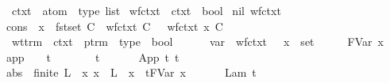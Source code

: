 \begin{isabellebody}
%
\isamarkuptrue%
\isamarkupfalse%
\ ctxt\ {\isacharequal}\ {\isachardoublequoteopen}{\isacharparenleft}atom\ {\isasymtimes}\ type{\isacharparenright}\ list{\isachardoublequoteclose}\isanewline
\isanewline
{}\isamarkupfalse%
\ wf{\isacharunderscore}ctxt\ {\isacharcolon}{\isacharcolon}\ {\isachardoublequoteopen}ctxt\ {\isasymRightarrow}\ bool{\isachardoublequoteclose}\ \isanewline
nil{\isacharcolon}\ {\isachardoublequoteopen}wf{\isacharunderscore}ctxt\ {\isacharbrackleft}{\isacharbrackright}{\isachardoublequoteclose}\ {\isacharbar}\isanewline
cons{\isacharcolon}\ {\isachardoublequoteopen}{\isasymlbrakk}\ x\ {\isasymnotin}\ fst{\isacharbackquote}set\ C\ {\isacharsemicolon}\ wf{\isacharunderscore}ctxt\ C\ {\isasymrbrakk}\ {\isasymLongrightarrow}\ wf{\isacharunderscore}ctxt\ {\isacharparenleft}{\isacharparenleft}x{\isacharcomma}\ {\isasymsigma}{\isacharparenright}{\isacharhash}C{\isacharparenright}{\isachardoublequoteclose}\isanewline
\isanewline
{}\isamarkupfalse%
\ wt{\isacharunderscore}trm\ {\isacharcolon}{\isacharcolon}\ {\isachardoublequoteopen}ctxt\ {\isasymRightarrow}\ ptrm\ {\isasymRightarrow}\ type\ {\isasymRightarrow}\ bool{\isachardoublequoteclose}\ {\isacharparenleft}{\isachardoublequoteopen}{\isacharunderscore}\ {\isasymturnstile}\ {\isacharunderscore}\ {\isacharcolon}\ {\isacharunderscore}{\isachardoublequoteclose}{\isacharparenright}\ \isanewline
var{\isacharcolon}\ {\isachardoublequoteopen}{\isasymlbrakk}\ wf{\isacharunderscore}ctxt\ {\isasymGamma}\ {\isacharsemicolon}\ {\isacharparenleft}x{\isacharcomma}{\isasymsigma}{\isacharparenright}\ {\isasymin}\ set\ {\isasymGamma}\ {\isasymrbrakk}\ {\isasymLongrightarrow}\ {\isasymGamma}\ {\isasymturnstile}\ FVar\ x\ {\isacharcolon}\ {\isasymsigma}{\isachardoublequoteclose}\ {\isacharbar}\isanewline
app{\isacharcolon}\ {\isachardoublequoteopen}{\isasymlbrakk}\ {\isasymGamma}\ {\isasymturnstile}\ t{}\ {\isacharcolon}\ {\isasymtau}\ {\isasymrightarrow}\ {\isasymsigma}\ {\isacharsemicolon}\ {\isasymGamma}\ {\isasymturnstile}\ t{}\ {\isacharcolon}\ {\isasymtau}\ {\isasymrbrakk}\ {\isasymLongrightarrow}\ {\isasymGamma}\ {\isasymturnstile}\ App\ t{}\ t{}\ {\isacharcolon}\ {\isasymsigma}{\isachardoublequoteclose}\ {\isacharbar}\isanewline
abs{\isacharcolon}\ {\isachardoublequoteopen}{\isasymlbrakk}\ finite\ L\ {\isacharsemicolon}\ {\isacharparenleft}{\isasymAnd}x{\isachardot}\ x\ {\isasymnotin}\ L\ {\isasymLongrightarrow}\ {\isacharparenleft}{\isacharparenleft}x{\isacharcomma}{\isasymsigma}{\isacharparenright}{\isacharhash}{\isasymGamma}{\isacharparenright}\ {\isasymturnstile}\ {\isacharparenleft}t{\isacharcircum}{\isacharparenleft}FVar\ x{\isacharparenright}{\isacharparenright}\ {\isacharcolon}\ {\isasymtau}{\isacharparenright}\ {\isasymrbrakk}\ {\isasymLongrightarrow}\ {\isasymGamma}\ {\isasymturnstile}\ Lam\ t\ {\isacharcolon}\ {\isasymsigma}\ {\isasymrightarrow}\ {\isasymtau}{\isachardoublequoteclose}\ {\isacharbar}\isanewline

\end{isabellebody}
